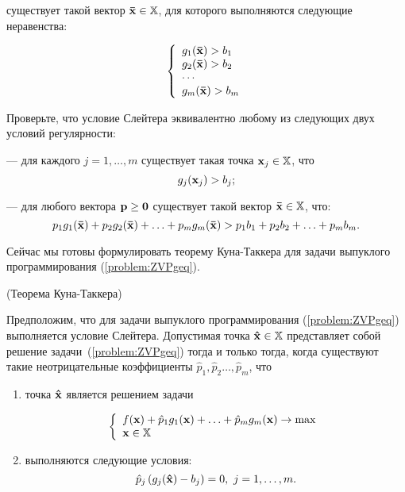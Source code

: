     существует такой вектор $\mathbf{\bar x}\in\mathbb{X}$, для
которого выполняются следующие неравенства:

\[
\left\{ \begin{array}{l}
 g_1(\mathbf{\bar x}) > b_1\\
 g_2(\mathbf{\bar x}) > b_2 \\
  \cdots  \\
 g_m(\mathbf{\bar x}) > b_m \\
 \end{array} \right.
\]

\begin{exer}
    Проверьте, что условие Слейтера эквивалентно любому из следующих двух условий
    регулярности:

    --- для каждого $j=1,\ldots,m$ существует такая точка
    $\mathbf{x}_j \in \mathbb{X}$, что
\[
 g_j(\mathbf{x}_j) > b_j;
\]

    --- для
    любого вектора $\mathbf{p} \geq \mathbf{0}$  существует такой вектор
    $\mathbf{\bar x} \in \mathbb{X}$, что:
\[
    p_1 g_1(\mathbf{\bar x}) + p_2 g_2(\mathbf{\bar x}) + \ldots + p_m
    g_m(\mathbf{\bar x}) > p_1 b_1 + p_2 b_2 + \ldots + p_m b_m.
\]
\end{exer}




    Сейчас мы готовы формулировать теорему Куна-Таккера для
    задачи выпуклого программирования (\ref{problem:ZVPgeq}).




\begin{teop}\label{Kuhn-T-Vip1}(Теорема Куна-Таккера)

    Предположим, что для задачи выпуклого программирования
    (\ref{problem:ZVPgeq}) выполняется условие Слейтера.
    Допустимая точка $\mathbf{\hat x}\in \mathbb{X}$ представляет собой решение
    задачи~(\ref{problem:ZVPgeq}) тогда и только тогда, когда существуют такие
    неотрицательные коэффициенты $\hat p_1, \hat p_2 \ldots, \hat
    p_m$, что



\begin{enumerate}
\renewcommand{\theenumi}{(\arabic{enumi})}
\item точка $\mathbf{\hat x}$ является решением задачи

\begin{equation}\label{KT-Max}
\left\{ \begin{array}{l}
   f(\mathbf{x}) + \hat p_1 g_1(\mathbf{x})+ \ldots + \hat p_m g_m(\mathbf{x}) \to \max  \\
   \mathbf{x} \in \mathbb{X} \\
 \end{array} \right.
\end{equation}


\item выполняются следующие условия:
\begin{equation}\label{dop-nezj-vp0}
    \hat p_j \,(g_j(\vc{\hat x}) - b_j)=0, \ j=1,\ldots,m.
\end{equation}

\end{enumerate}
\end{teop}


